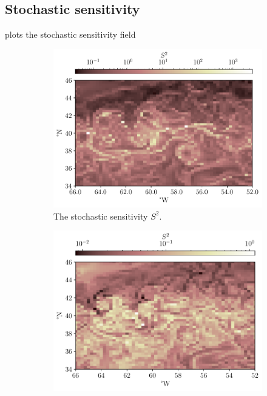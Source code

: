 \subsection{Stochastic sensitivity}


 plots the stochastic sensitivity field





\begin{figure}
	\begin{center}
		\begin{subfigure}[t]{0.49\textwidth}
			\includegraphics[width=\textwidth]{chp06_applications/figures/gulf_stream/S2_field_grid}
			\caption{The stochastic sensitivity \(S^2\).}
		\end{subfigure}
		\begin{subfigure}[t]{0.49\textwidth}
			\includegraphics[width=\textwidth]{chp06_applications/figures/gulf_stream/s2min_field_grid}

\end{subfigure}
\end{center}
\end{figure}
